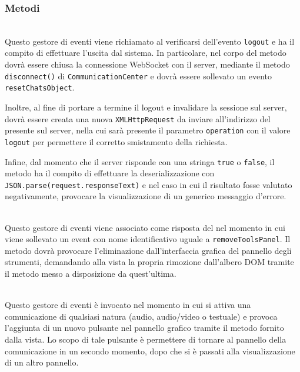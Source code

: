 \subsubsection*{Metodi}
\begin{description}

  \item{}\\
  Questo gestore di eventi viene richiamato al verificarsi dell'evento \verb'logout' e ha il compito di effettuare l'uscita dal sistema. In particolare, nel corpo del metodo dovrà essere chiusa la connessione WebSocket con il server, mediante il metodo \verb'disconnect()' di \texttt{CommunicationCenter} e dovrà essere sollevato un evento \verb'resetChatsObject'.
  
  Inoltre, al fine di portare a termine il logout e invalidare la sessione sul server, dovrà essere creata una nuova \verb'XMLHttpRequest' da inviare all'indirizzo del  presente sul server, nella cui  sarà presente il parametro \verb'operation' con il valore \texttt{logout} per permettere il corretto smistamento della richiesta.
  
  Infine, dal momento che il server risponde con una stringa \verb'true' o \verb'false', il metodo ha il compito di effettuare la deserializzazione con \verb'JSON.parse(request.responseText)' e nel caso in cui il risultato fosse valutato negativamente, provocare la visualizzazione di un generico messaggio d'errore.
  
  \item{}\\
  Questo gestore di eventi viene associato come risposta del  nel momento in cui viene sollevato un event con nome identificativo uguale a \verb'removeToolsPanel'. Il metodo dovrà provocare l'eliminazione dall'interfaccia grafica del pannello degli strumenti, demandando alla vista la propria rimozione dall'albero DOM tramite il metodo  messo a disposizione da quest'ultima.
  
  \item{}\\
  Questo gestore di eventi è invocato nel momento in cui si attiva una comunicazione di qualsiasi natura (audio, audio/video o testuale) e provoca l'aggiunta di un nuovo pulsante nel pannello grafico tramite il metodo  fornito dalla vista. Lo scopo di tale pulsante è permettere di tornare al pannello della comunicazione in un secondo momento, dopo che si è passati alla visualizzazione di un altro pannello.
  

\end{description}
